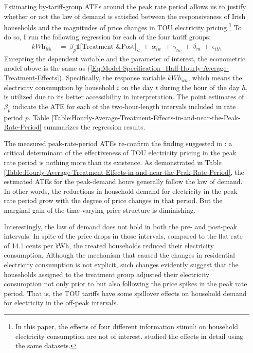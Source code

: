 Estimating by-tariff-group ATEs around the peak rate period allows us to justify whether or not the law of demand is satisfied between the responsiveness of Irish households and the magnitudes of price changes in TOU electricity pricing.\footnote{In this paper, the effects of four different information stimuli on household electricity consumption are not of interest. \cite{The-Effect-of-Information-on-TOU-Electricity-Use:An-Irish-Residential-Study_Pon_2017} studied the effects in detail using the same datasets.} To do so, I run the following regression for each of the four tariff groups:
\begin{equation}
\begin{split}
    \textit{kWh}_{ith} \ 
    & = \ \beta_{p} \mathbb{1}\big[ \text{Treatment \& Post} \big]_{it} \ + \ \alpha_{iw} \ + \ \gamma_{tw} \ + \ \delta_{m} \ + \ \epsilon_{ith}
\end{split}
\label{Eq:Model-Specification_Hourly-Average-Treatment-Effects}
\end{equation}
Excepting the dependent variable and the parameter of interest, the econometric model above is the same as (\ref{Eq:Model-Specification_Half-Hourly-Average-Treatment-Effects}). Specifically, the response variable $kWh_{ith}$, which means the electricity consumption by household $i$ on the day $t$ during the hour of the day $h$, is utilized due to its better accessibility in interpretation. The point estimates of $\beta_{p}$ indicate the ATE for each of the two-hour-length intervals included in rate period $p$. Table \ref{Table:Hourly-Average-Treatment-Effects-in-and-near-the-Peak-Rate-Period} summarizes the regression results. 

The measured peak-rate-period ATEs re-confirm the finding suggested in \cite{Peaking-Interest:How-Awareness-Drives-the-Effectiveness-of-Time-of-Use-Electricity-Pricing_Prest_2020}: a critical determinant of the effectiveness of TOU electricity pricing in the peak rate period is nothing more than its existence. As demonstrated in Table \ref{Table:Hourly-Average-Treatment-Effects-in-and-near-the-Peak-Rate-Period}, the estimated ATEs for the peak-demand hours generally follow the law of demand. In other words, the reductions in household demand for electricity in the peak rate period grow with the degree of price changes in that period. But the marginal gain of the time-varying price structure is diminishing. 

Interestingly, the law of demand does not hold in both the pre- and post-peak intervals. In spite of the price drops in those intervals, compared to the flat rate of 14.1 cents per kWh, the treated households reduced their electricity consumption. Although the mechanism that caused the changes in residential electricity consumption is not explicit, such changes evidently suggest that the households assigned to the treatment group adjusted their electricity consumption not only prior to but also following the price spikes in the peak rate period. That is, the TOU tariffs have some spillover effects on household demand for electricity in the off-peak intervals. 

